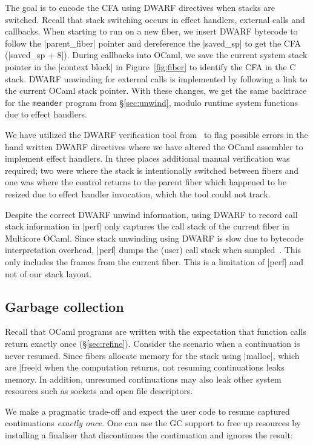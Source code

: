 \documentclass[sigplan,screen]{acmart}
\begin{document}
The goal is to encode the CFA using DWARF directives when stacks are switched.
Recall that stack switching occurs in effect handlers, external calls and
callbacks. When starting to run on a new fiber, we insert DWARF bytecode to
follow the |parent_fiber| pointer and dereference the |saved_sp| to get the CFA
(|saved_sp + 8|). During callbacks into OCaml, we save the current system stack
pointer in the |context block| in Figure~\ref{fig:fiber} to identify the CFA in
the C stack. DWARF unwinding for external calls is implemented by following a
link to the current OCaml stack pointer. With these changes, we get the same
backtrace for the \texttt{meander} program from \S\ref{sec:unwind}, modulo
runtime system functions due to effect handlers.

We have utilized the DWARF verification tool from~\cite{Bastian19} to flag
possible errors in the hand written DWARF directives where we have altered the
OCaml assembler to implement effect handlers. In three places additional manual
verification was required; two were where the stack is intentionally switched
between fibers and one was where the control returns to the parent fiber which
happened to be resized due to effect handler invocation, which the tool could
not track.

Despite the correct DWARF unwind information, using DWARF to record call stack
information in |perf| only captures the call stack of the current fiber in
Multicore OCaml. Since stack unwinding using DWARF is slow due to bytecode
interpretation overhead, |perf| dumps the (user) call stack when
sampled~\cite{Bastian19}. This only includes the frames from the current fiber.
This is a limitation of |perf| and not of our stack layout.

\subsection{Garbage collection}

Recall that OCaml programs are written with the expectation that function calls
return exactly once (\S\ref{sec:refine}). Consider the scenario when a
continuation is never resumed. Since fibers allocate memory for the stack using
|malloc|, which are |free|d when the computation returns, not resuming
continuations leaks memory. In addition, unresumed continuations may also leak
other system resources such as sockets and open file descriptors.

We make a pragmatic trade-off and expect the user code to resume captured
continuations \emph{exactly once}. One can use the GC support to free up
resources by installing a finaliser that discontinues the continuation and
ignores the result:
\end{document}
